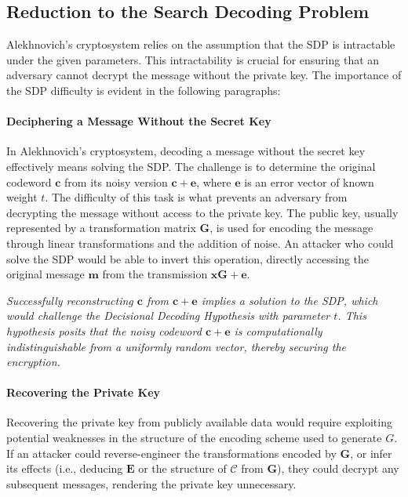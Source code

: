\subsection{Reduction to the Search Decoding Problem}

Alekhnovich’s cryptosystem relies on the assumption that the SDP is intractable under the given parameters. This intractability is crucial for ensuring that an adversary cannot decrypt the message without the private key. The importance of the SDP difficulty is evident in the following paragraphs:

\paragraph{Deciphering a Message Without the Secret Key}
In Alekhnovich's cryptosystem, decoding a message without the secret key effectively means solving the SDP. The challenge is to determine the original codeword $\mathbf{c}$ from its noisy version $\mathbf{c} + \mathbf{e}$, where $\mathbf{e}$ is an error vector of known weight $t$. The difficulty of this task is what prevents an adversary from decrypting the message without access to the private key. The public key, usually represented by a transformation matrix $ \mathbf{G}$, is used for encoding the message through linear transformations and the addition of noise. An attacker who could solve the SDP would be able to invert this operation, directly accessing the original message $ \mathbf{m} $ from the transmission $\mathbf{xG} + \mathbf{e} $.

\textit{Successfully reconstructing $\mathbf{c}$ from $\mathbf{c} + \mathbf{e}$ implies a solution to the SDP, which would challenge the Decisional Decoding Hypothesis with parameter $ t $. This hypothesis posits that the noisy codeword $\mathbf{c} + \mathbf{e}$ is computationally indistinguishable from a uniformly random vector, thereby securing the encryption.}

\paragraph{Recovering the Private Key}
Recovering the private key from publicly available data would require exploiting potential weaknesses in the structure of the encoding scheme used to generate $ G $. If an attacker could reverse-engineer the transformations encoded by $ \mathbf{G} $, or infer its effects (i.e., deducing $ \mathbf{E} $ or the structure of $ \mathcal{C} $ from $ \mathbf{G} $), they could decrypt any subsequent messages, rendering the private key unnecessary.

